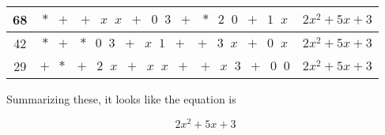 \begin{center}
\begin{tabular}{| c | c | c |}
68 & \hspace{5pt} $*\;\;+\;\;+\;\;x\;\;x\;\;+\;\;0\;\;3\;\;+\;\;*\;\;2\;\;0\;\;+\;\;1\;\;x$ \hspace{5pt} & \hspace{5pt} $2x^2 + 5x + 3$ \hspace{5pt}  \\ \hline
42 & \hspace{5pt} $*\;\;+\;\;*\;\;0\;\;3\;\;+\;\;x\;\;1\;\;+\;\;+\;\;3\;\;x\;\;+\;\;0\;\;x$ \hspace{5pt} & \hspace{5pt} $2x^2 + 5x + 3$ \hspace{5pt}  \\ \hline
29 & \hspace{5pt} $+\;\;*\;\;+\;\;2\;\;x\;\;+\;\;x\;\;x\;\;+\;\;+\;\;x\;\;3\;\;+\;\;0\;\;0$ \hspace{5pt} & \hspace{5pt} $2x^2 + 5x + 3$ \hspace{5pt}  \\ \hline
\end{tabular}
\end{center}

Summarizing these, it looks like the equation is

\begin{equation}\label{p7_solution}
2x^2 + 5x + 3
\end{equation}